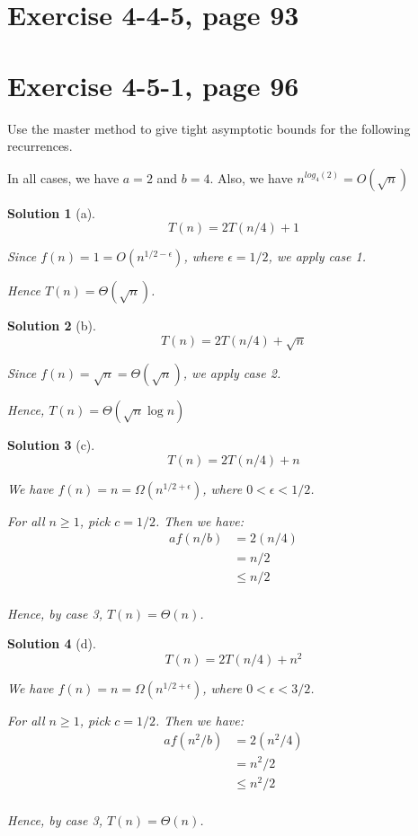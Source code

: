 \documentclass[letterpaper, 11pt]{article}
\theoremstyle{mystyle}
\newtheorem*{sln}{Solution}
\begin{document}
\section{Exercise 4-4-5, page 93}


\section{Exercise 4-5-1, page 96}
Use the master method to give tight asymptotic bounds for the following recurrences.

In all cases, we have $a=2$ and $b=4$. Also, we have $n^{log_4 (2)} = O(\sqrt{n})$

\begin{sln}[a]
    \[T(n) = 2T(n/4) + 1\]

    Since $f(n) = 1 = O(n^{1/2 - \epsilon})$, where $\epsilon = 1/2$, we apply case 1.

    Hence $T(n) = \Theta (\sqrt{n})$.
\end{sln}

\begin{sln}[b]
    \[T(n) = 2T(n/4) + \sqrt{n}\]

    Since $f(n) = \sqrt{n} = \Theta (\sqrt{n})$, we apply case 2.

    Hence, $T(n) = \Theta (\sqrt{n} \log n)$
\end{sln}

\begin{sln}[c]
    \[T(n) = 2T(n/4) + n\]

    We have $f(n) = n = \Omega (n^{1/2+\epsilon})$, where $0 <\epsilon < 1/2$. 

    For all $n \geq 1$, pick $c = 1/2$. Then we have:
    \begin{align*}
        af(n/b) & = 2(n/4) \\
                & = n/2 \\
                & \leq n/2 \\
    \end{align*}

    Hence, by case 3, $T(n) = \Theta(n)$.
\end{sln}

\begin{sln}[d]
    \[T(n) = 2T(n/4) + n^2 \]

    We have $f(n) = n = \Omega (n^{1/2+\epsilon})$, where $0 <\epsilon < 3/2$.

    For all $n \geq 1$, pick $c = 1/2$. Then we have:
    \begin{align*}
        af(n^2/b)   & = 2(n^2/4) \\
                    & = n^2/2 \\
                    & \leq n^2/2 \\
    \end{align*}

    Hence, by case 3, $T(n) = \Theta(n)$. 
\end{sln}
\end{document}
